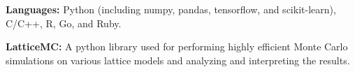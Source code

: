 

\begin{cvparagraph}

    \vspace{2ex}
    \begin{cvitems}
        \item {\textbf{Languages:} Python (including numpy, pandas, tensorflow,
                and scikit-learn), C/C++, R, Go, and Ruby.}
        \item {\textbf{LatticeMC:} A python library used for performing
                highly efficient Monte Carlo simulations on various lattice
                models and analyzing and interpreting the results.}
   \end{cvitems}

\end{cvparagraph}


